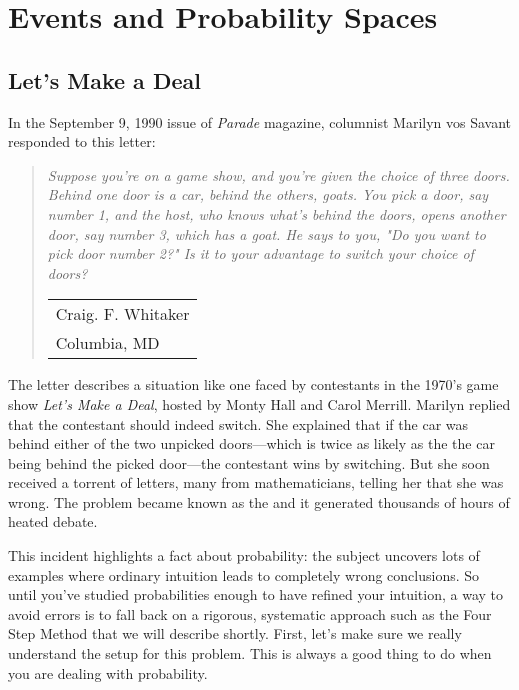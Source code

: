 \chapter{Events and Probability Spaces}\label{probability_chap}

\section{Let's Make a Deal}

In the September 9, 1990 issue of \emph{Parade} magazine, columnist
Marilyn vos Savant responded to this letter:


\begin{quote}
\emph{Suppose you're on a game show, and you're given the
choice of three doors.  Behind one door is a car, behind the others,
goats.  You pick a door, say number 1, and the host, who knows what's
behind the doors, opens another door, say number 3, which has a goat.
He says to you, "Do you want to pick door number 2?"  Is it to your
advantage to switch your choice of doors?}
\begin{flushright}
\begin{tabular}{l}
Craig. F. Whitaker \\
Columbia, MD
\end{tabular}
\end{flushright}
\end{quote}

The letter describes a situation like one faced by contestants in the
1970's game show \emph{Let's Make a Deal}, hosted by Monty Hall and
Carol Merrill.  Marilyn replied that the contestant should indeed
switch.  She explained that if the car was behind either of the two
unpicked doors---which is twice as likely as the the car being behind
the picked door---the contestant wins by switching.  But she soon
received a torrent of letters, many from mathematicians, telling her
that she was wrong.  The problem became known as the  and it generated thousands of hours of heated debate.

This incident highlights a fact about probability: the subject uncovers
lots of examples where ordinary intuition leads to completely wrong
conclusions.  So until you've studied probabilities enough to have
refined your intuition, a way to avoid errors is to fall back on a
rigorous, systematic approach such as the Four Step Method that we
will describe shortly.  First, let's make sure we really understand
the setup for this problem.  This is always a good thing to do when
you are dealing with probability.


